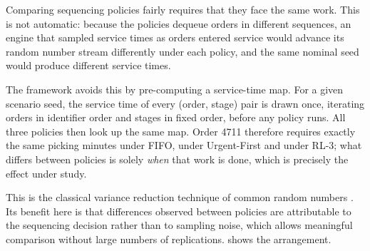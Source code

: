 Comparing sequencing policies fairly requires that they face the same work. This is not
automatic: because the policies dequeue orders in different sequences, an engine that sampled
service times as orders entered service would advance its random number stream differently
under each policy, and the same nominal seed would produce different service times.

The framework avoids this by pre-computing a service-time map. For a given scenario seed, the
service time of every (order, stage) pair is drawn once, iterating orders in identifier order
and stages in fixed order, before any policy runs. All three policies then look up the same
map. Order \num{4711} therefore requires exactly the same picking minutes under FIFO, under
Urgent-First and under RL-3; what differs between policies is solely \emph{when} that work is
done, which is precisely the effect under study.

This is the classical variance reduction technique of common random numbers
\citep{law2015}. Its benefit here is that differences observed between policies are attributable
to the sequencing decision rather than to sampling noise, which allows meaningful comparison
without large numbers of replications.  shows the arrangement.


